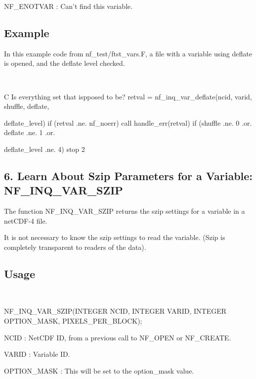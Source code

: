 {\ttfamily N\+F\+\_\+\+E\+N\+O\+T\+V\+AR} \+: Can’t find this variable.

\subsection*{Example }

In this example code from nf\+\_\+test/ftst\+\_\+vars.\+F, a file with a variable using deflate is opened, and the deflate level checked.

 

C Is everything set that ispposed to be? retval = nf\+\_\+inq\+\_\+var\+\_\+deflate(ncid, varid, shuffle, deflate,
\begin{DoxyItemize}
\item deflate\+\_\+level) if (retval .ne. nf\+\_\+noerr) call handle\+\_\+err(retval) if (shuffle .ne. 0 .or. deflate .ne. 1 .or.
\item deflate\+\_\+level .ne. 4) stop 2
\end{DoxyItemize}

\subsection*{6. Learn About Szip Parameters for a Variable\+: {\ttfamily N\+F\+\_\+\+I\+N\+Q\+\_\+\+V\+A\+R\+\_\+\+S\+Z\+IP} }

The function N\+F\+\_\+\+I\+N\+Q\+\_\+\+V\+A\+R\+\_\+\+S\+Z\+IP returns the szip settings for a variable in a net\+C\+D\+F-\/4 file.

It is not necessary to know the szip settings to read the variable. (Szip is completely transparent to readers of the data).

\subsection*{Usage }

 

N\+F\+\_\+\+I\+N\+Q\+\_\+\+V\+A\+R\+\_\+\+S\+Z\+IP(I\+N\+T\+E\+G\+ER N\+C\+ID, I\+N\+T\+E\+G\+ER V\+A\+R\+ID, I\+N\+T\+E\+G\+ER O\+P\+T\+I\+O\+N\+\_\+\+M\+A\+SK, P\+I\+X\+E\+L\+S\+\_\+\+P\+E\+R\+\_\+\+B\+L\+O\+CK);

{\ttfamily N\+C\+ID} \+: Net\+C\+DF ID, from a previous call to N\+F\+\_\+\+O\+P\+EN or N\+F\+\_\+\+C\+R\+E\+A\+TE.

{\ttfamily V\+A\+R\+ID} \+: Variable ID.

{\ttfamily O\+P\+T\+I\+O\+N\+\_\+\+M\+A\+SK} \+: This will be set to the option\+\_\+mask value.

